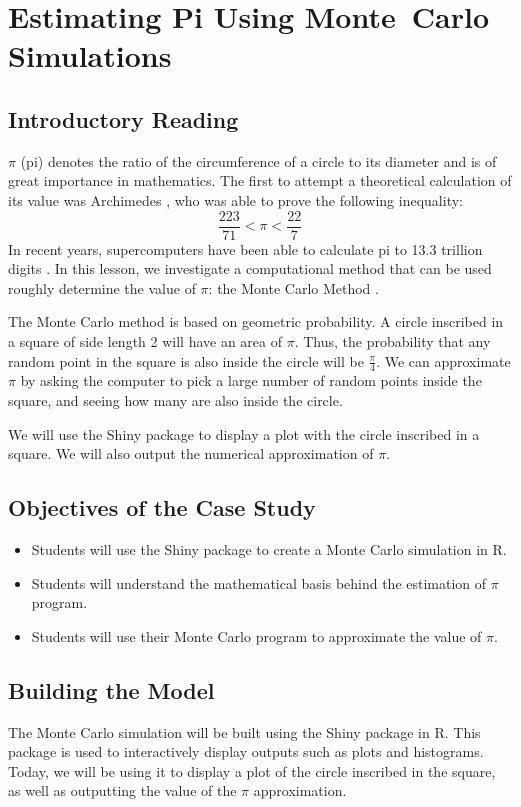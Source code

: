 \chapter{Estimating Pi Using Monte~Carlo Simulations}
\section{Introductory Reading}
$\pi$ (pi) denotes the ratio of the circumference of a circle to its diameter and is of great importance in mathematics.
The first to attempt a theoretical calculation of its value was Archimedes \cite{smoller}, who was able to prove the following inequality:
\[
\frac{223}{71} < \pi < \frac{22}{7}
\]
In recent years, supercomputers have been able to calculate pi to 13.3 trillion digits \cite{yee}.
In this lesson, we investigate a computational method that can be used roughly determine the value of $\pi$: the Monte Carlo Method \cite{andersson}.

\noindent 
The Monte Carlo method is based on geometric probability.
A circle inscribed in a square of side length 2 will have an area of $\pi$.
Thus, the probability that any random point in the square is also inside the circle will be $\frac{\pi}{4}$.
We can approximate $\pi$ by asking the computer to pick a large number of random points inside the square, and seeing how many are also inside the circle.

\noindent 
We will use the Shiny package to display a plot with the circle inscribed in a square.
We will also output the numerical approximation of $\pi$.

\section{Objectives of the Case Study}
\begin{itemize}
\item
Students will use the Shiny package to create a Monte Carlo simulation in R.
\item
Students will understand the mathematical basis behind the estimation of $\pi$ program.
\item
Students will use their Monte Carlo program to approximate the value of $\pi$.
\end{itemize}
\section{Building the Model}

The Monte Carlo simulation will be built using the Shiny package in R.
This package is used to interactively display outputs such as plots and histograms.
Today, we will be using it to display a plot of the circle inscribed in the square, as well as outputting the value of the $\pi$ approximation.

